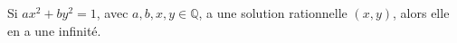 Si $ax^2 + by^2 = 1$, avec $a, b, x, y \in \mathbb{Q}$, a une solution rationnelle $(x, y)$, alors elle en a une infinité.
